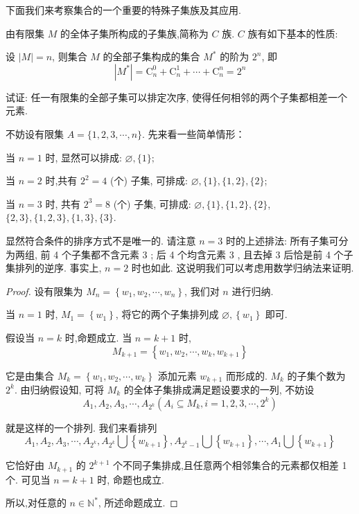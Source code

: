 下面我们来考察集合的一个重要的特殊子集族及其应用.

由有限集 $M$ 的全体子集所构成的子集族,简称为 $C$ 族. $C$ 族有如下基本的性质:

\begin{property}
	设 $|M|=n$, 则集合 $M$ 的全部子集构成的集合 $M^{*}$ 的阶为 $2^{n}$, 即
	$$
		\left|M^{*}\right|=\mathrm{C}_{n}^{0}+\mathrm{C}_{n}^{1}+\cdots+\mathrm{C}_{n}^{n}=2^{n}
	$$
\end{property}

\begin{example}\label{ex:任一有限集的全部子集}
	试证: 任一有限集的全部子集可以排定次序, 使得任何相邻的两个子集都相差一个元素.
\end{example}

\begin{analysis}
	不妨设有限集 $A=\{1,2,3, \cdots, n\}$. 先来看一些简单情形：

	当 $n=1$ 时, 显然可以排成: $\varnothing,\{1\} ;$

	当 $n=2$ 时,共有 $2^{2}=4$ (个) 子集, 可排成: $\varnothing,\{1\},\{1,2\},\{2\}$;

	当 $n=3$ 时, 共有 $2^{3}=8$ (个) 子集, 可排成: $\varnothing,\{1\},\{1,2\},\{2\}$, $\{2,3\},\{1,2,3\},\{1,3\},\{3\}$.

	显然符合条件的排序方式不是唯一的. 请注意 $n=3$ 时的上述排法: 所有子集可分为两组, 前 4 个子集都不含元素 3 ; 后 4 个均含元素 3 , 且去掉 3 后恰是前 4 个子集排列的逆序. 事实上, $n=2$ 时也如此. 这说明我们可以考虑用数学归纳法来证明.
\end{analysis}

\begin{proof}
	设有限集为 $M_{n}=\left\{w_{1}, w_{2}, \cdots, w_{n}\right\}$, 我们对 $n$ 进行归纳.

	当 $n=1$ 时, $M_{1}=\left\{w_{1}\right\}$, 将它的两个子集排列成 $\varnothing,\left\{w_{1}\right\}$ 即可.

	假设当 $n=k$ 时,命题成立. 当 $n=k+1$ 时,
	$$
		M_{k+1}=\left\{w_{1}, w_{2}, \cdots, w_{k}, w_{k+1}\right\}
	$$

	它是由集合 $M_{k}=\left\{w_{1}, w_{2}, \cdots, w_{k}\right\}$ 添加元素 $w_{k+1}$ 而形成的. $M_{k}$ 的子集个数为\\
	$2^{k}$. 由归纳假设知, 可将 $M_{k}$ 的全体子集排成满足题设要求的一列, 不妨设
	$$
		A_{1}, A_{2}, A_{3}, \cdots, A_{2^{k}}\left(A_{i} \subseteq M_{k}, i=1,2,3, \cdots, 2^{k}\right)
	$$

	就是这样的一个排列. 我们来看排列
	$$
		A_{1}, A_{2}, A_{3}, \cdots, A_{2^{k}}, A_{2^{k}} \bigcup\left\{w_{k+1}\right\}, A_{2^{k}-1} \bigcup\left\{w_{k+1}\right\}, \cdots, A_{1} \bigcup\left\{w_{k+1}\right\}
	$$

	它恰好由 $M_{k+1}$ 的 $2^{k+1}$ 个不同子集排成,且任意两个相邻集合的元素都仅相差 1 个. 可见当 $n=k+1$ 时, 命题也成立.

	所以,对任意的 $n \in \mathbb{N}^{*}$, 所述命题成立.
\end{proof}

